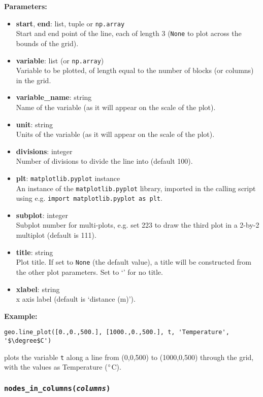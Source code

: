 \textbf{Parameters:}
\begin{itemize}
\item \textbf{start}, \textbf{end}: list, tuple or \texttt{np.array}\\
  Start and end point of the line, each of length 3 (\texttt{None} to plot across the bounds of the grid).
\item \textbf{variable}: list (or \texttt{np.array})\\
  Variable to be plotted, of length equal to the number of blocks (or columns) in the grid.
\item \textbf{variable\_name}: string\\
  Name of the variable (as it will appear on the scale of the plot).
\item \textbf{unit}: string\\
  Units of the variable (as it will appear on the scale of the plot).
\item \textbf{divisions}: integer\\
  Number of divisions to divide the line into (default 100).
\item \textbf{plt}: \texttt{matplotlib.pyplot} instance\\
  An instance of the \texttt{matplotlib.pyplot} library, imported in the calling script using e.g. \texttt{import matplotlib.pyplot as plt}.
\item \textbf{subplot}: integer\\
  Subplot number for multi-plots, e.g. set 223 to draw the third plot in a 2-by-2 multiplot (default is 111).
\item \textbf{title}: string\\
  Plot title.  If set to \texttt{None} (the default value), a title will be constructed from the other plot parameters.  Set to `' for no title.
\item \textbf{xlabel}: string\\
  x axis label (default is `distance (m)').
\end{itemize}

\textbf{Example:}

\begin{lstlisting}
geo.line_plot([0.,0.,500.], [1000.,0.,500.], t, 'Temperature', '$\degree$C')
\end{lstlisting}

plots the variable \texttt{t} along a line from (0,0,500) to (1000,0,500) through the grid, with the values as Temperature ($\degree$C).

\begin{snugshade}\subsubsection{\texttt{nodes\_in\_columns(\emph{columns})}}\end{snugshade}
\label{sec:mulgrid:nodes_in_columns}

